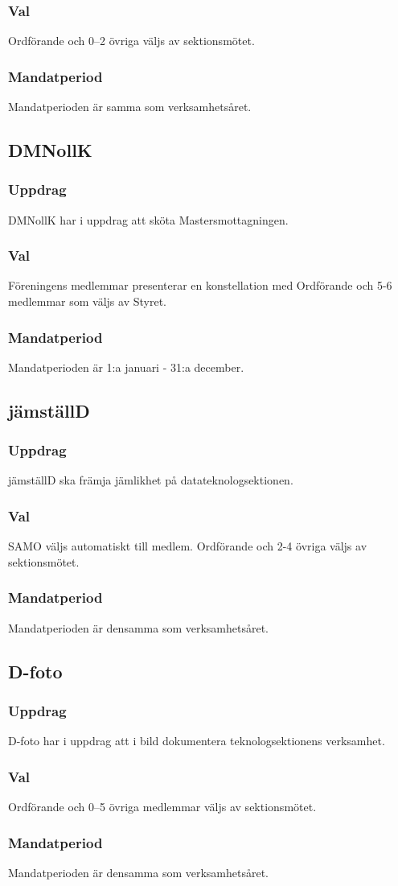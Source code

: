 \subsubsection{Val}
Ordförande och 0–2 övriga väljs av sektionsmötet.
\subsubsection{Mandatperiod}
Mandatperioden är samma som verksamhetsåret.

\subsection{DMNollK}
\subsubsection{Uppdrag}
DMNollK har i uppdrag att sköta Mastersmottagningen.
\subsubsection{Val}
Föreningens medlemmar presenterar en konstellation med Ordförande och 5-6 medlemmar som väljs av Styret.
\subsubsection{Mandatperiod}
Mandatperioden är 1:a januari - 31:a december.

\subsection{jämställD}
\subsubsection{Uppdrag}
jämställD ska främja jämlikhet på datateknologsektionen.
\subsubsection{Val}
SAMO väljs automatiskt till medlem. Ordförande och 2-4 övriga väljs av sektionsmötet.
\subsubsection{Mandatperiod}
Mandatperioden är densamma som verksamhetsåret.

\subsection{D-foto}
\subsubsection{Uppdrag}
D-foto har i uppdrag att i bild dokumentera teknologsektionens verksamhet.
\subsubsection{Val}
Ordförande och 0--5 övriga medlemmar väljs av sektionsmötet.
\subsubsection{Mandatperiod}
Mandatperioden är densamma som verksamhetsåret.

\newpage
